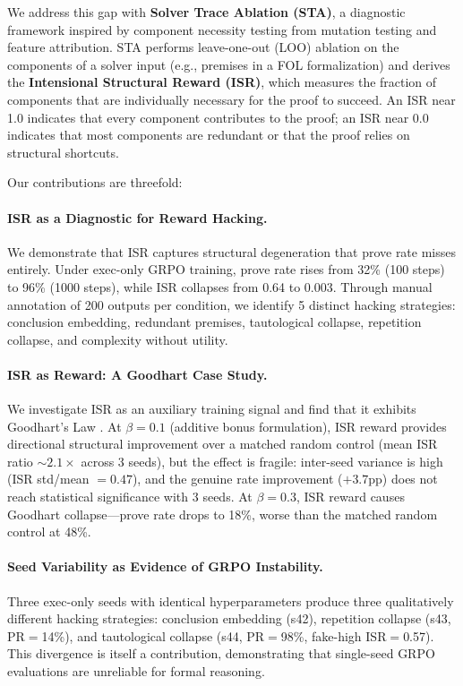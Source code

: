 \documentclass[11pt,a4paper]{article}
\begin{document}
We address this gap with \textbf{Solver Trace Ablation (STA)}, a diagnostic framework inspired by component necessity testing from mutation testing and feature attribution.
STA performs leave-one-out (LOO) ablation on the components of a solver input (e.g., premises in a FOL formalization) and derives the \textbf{Intensional Structural Reward (ISR)}, which measures the fraction of components that are individually necessary for the proof to succeed.
An ISR near 1.0 indicates that every component contributes to the proof; an ISR near 0.0 indicates that most components are redundant or that the proof relies on structural shortcuts.

Our contributions are threefold:

\paragraph{ISR as a Diagnostic for Reward Hacking.}
We demonstrate that ISR captures structural degeneration that prove rate misses entirely.
Under exec-only GRPO training, prove rate rises from 32\% (100 steps) to 96\% (1000 steps), while ISR collapses from 0.64 to 0.003.
Through manual annotation of 200 outputs per condition, we identify 5 distinct hacking strategies: conclusion embedding, redundant premises, tautological collapse, repetition collapse, and complexity without utility.

\paragraph{ISR as Reward: A Goodhart Case Study.}
We investigate ISR as an auxiliary training signal and find that it exhibits Goodhart's Law \cite{manheim2019categorizing}.
At $\beta{=}0.1$ (additive bonus formulation), ISR reward provides directional structural improvement over a matched random control (mean ISR ratio ${\sim}2.1\times$ across 3 seeds), but the effect is fragile: inter-seed variance is high (ISR std/mean $= 0.47$), and the genuine rate improvement ($+3.7$pp) does not reach statistical significance with 3 seeds.
At $\beta{=}0.3$, ISR reward causes Goodhart collapse---prove rate drops to 18\%, worse than the matched random control at 48\%.

\paragraph{Seed Variability as Evidence of GRPO Instability.}
Three exec-only seeds with identical hyperparameters produce three qualitatively different hacking strategies: conclusion embedding (s42), repetition collapse (s43, PR$=$14\%), and tautological collapse (s44, PR$=$98\%, fake-high ISR$=$0.57).
This divergence is itself a contribution, demonstrating that single-seed GRPO evaluations are unreliable for formal reasoning.
\end{document}
